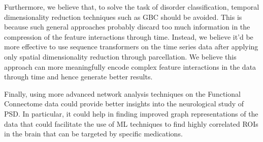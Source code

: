 \documentclass[fleqn,moreauthors,10pt]{ds_report}
\begin{document}
Furthermore, we believe that, to solve the task of disorder classification, temporal dimensionality reduction techniques such as GBC should be avoided. This is because such general approaches probably discard too much information in the compression of the feature interactions through time. Instead, we believe it'd be more effective to use sequence transformers on the time series data after applying only spatial dimensionality reduction through parcellation. We believe this approach can more meaningfully encode complex feature interactions in the data through time and hence generate better results.

Finally, using more advanced network analysis techniques on the Functional Connectome data could provide better insights into the neurological study of PSD. In particular, it could help in finding improved graph representations of the data that could facilitate the use of ML techniques to find highly correlated ROIs in the brain that can be targeted by specific medications.





\end{document}
